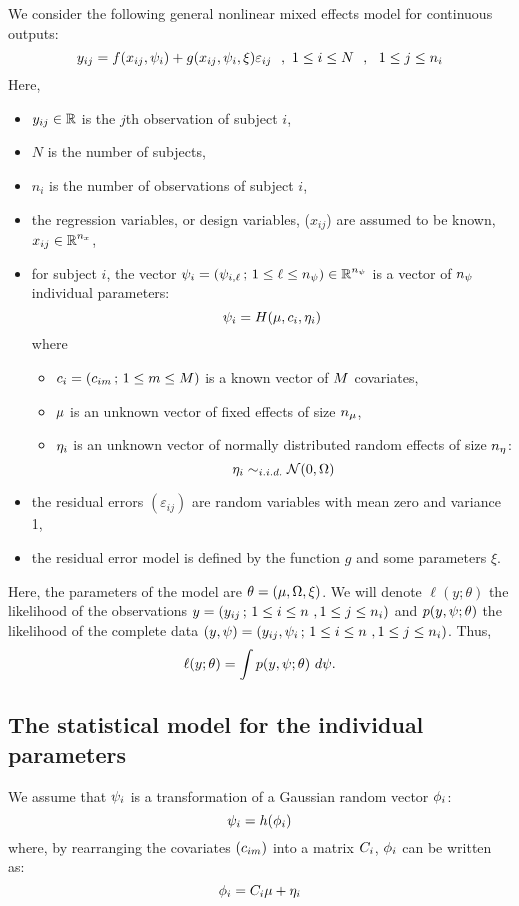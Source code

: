 We consider the following general nonlinear mixed effects model for continuous outputs:
\begin{equation}
\label{nlme}
y_{ij}=f(x_{ij},\psigi)+ g(x_{ij},\psigi,\xi)\varepsilon_{ij} \ \ , \ 1\leq i \leq N \ \ ,
\ \ 1 \leq j \leq n_i
\end{equation}
Here,
\begin{itemize}
\item $y_{ij}\in \mbox{$\mathbb{R}$}$ is the $j$th observation of subject $i$,
\item $N$ is the number of subjects,
\item $n_i$ is the number of observations of subject $i$,
\item the regression variables, or design variables, ($x_{ij}$) are assumed to be known, $x_{ij}\in
\mbox{$\mathbb{R}$}^{n_x}$,
\item for subject $i$, the vector ${\psi_i}=({\psi_{i,\ell}} \, ; \, 1\leq \ell \leq {n_\psi}) \in \mbox{$\mathbb{R}$}^{n_\psi}$ is a vector of ${n_\psi}$ individual parameters:
\begin{equation} \label{prior}
\psigi=H(\fixed_effect,\covariate_i,\etagi)
\end{equation}
where
\begin{itemize}
\item $c_i =(c_{im} \, ; \, 1\leq m \leq M)$ is a known vector of $M$ covariates,
\item $\fixed_effect$ is an unknown vector of fixed effects of size $\nbeta$,
\item ${\eta_i}$ is an unknown vector of normally distributed random effects of size ${n_\eta}$: 
$${\eta_i} \sim_{i.i.d.} {\cal N}(0,{\Omega})$$
\end{itemize}
\item the residual errors $(\varepsilon_{ij})$  are random variables with mean zero and variance 1,
\item the residual error model is defined by the function $g$ and some parameters $\xi$.
\end{itemize}

Here, the parameters of the model are $\thetag=(\fixed_effect,\IIV,\xi)$. We will denote
 $\ell(y;\theta)$ the likelihood of the observations $y =(y_{ij} \, ; \, 1  \leq i \leq n \ , 1
\leq j \leq n_i)$ and $p(y,\psi;\theta) $ the likelihood of the complete data $(y,\psi)= (y_{ij}, \psi_i \, ; \, 1
\leq i \leq n \ , 1 \leq j \leq n_i)$. Thus, $$\ell(y;\theta) = \int p(\yg,\psig;\theta)  \ d\psig .$$

\subsection{The statistical model for the individual parameters} \label{section_model_indiv}
We assume that ${\psi_i}$ is a transformation of a Gaussian random vector ${{\phi}_i}$:
\begin{equation} \label{prior2}
{\psi_i}=h({{\phi}_i})
\end{equation}
where, by rearranging the covariates $(c_{im})$ into a matrix $C_i$, ${{\phi}_i}$ can be written as:
\begin{equation} \label{prior3}
\phigi=\Covariate_i \fixed_effect + \etagi
\end{equation}

